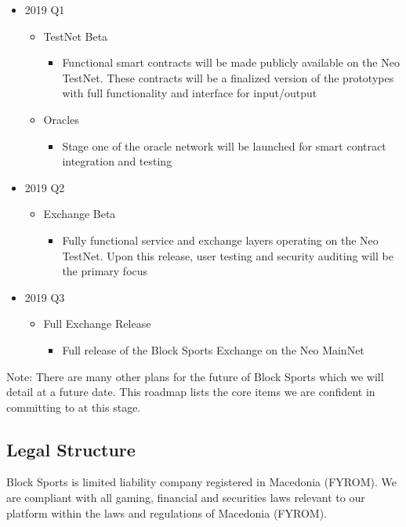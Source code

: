 \documentclass{article}
\begin{document}
\begin{itemize}
   \item 2019 Q1
   \begin{itemize}
     \item TestNet Beta
     	\begin{itemize}
     		\item Functional smart contracts will be made publicly available on the Neo TestNet. These contracts will be a finalized version of the prototypes with full functionality and interface for input/output
     	\end{itemize}
     \item Oracles
     	\begin{itemize}
     		\item Stage one of the oracle network will be launched for smart contract integration and testing
     	\end{itemize}
   \end{itemize}    
 
    \item 2019 Q2
   \begin{itemize}
     \item Exchange Beta
     	\begin{itemize}
     		\item Fully functional service and exchange layers operating on the Neo TestNet. Upon this release, user testing and security auditing will be the primary focus 
     	\end{itemize}
   \end{itemize} 
   
   \item 2019 Q3
   \begin{itemize}
     \item Full Exchange Release
     	\begin{itemize}
     		\item Full release of the Block Sports Exchange on the Neo MainNet
     	\end{itemize}
   \end{itemize} 
   
\end{itemize}

Note: There are many other plans for the future of Block Sports which we will detail at a future date. This roadmap lists the core items we are confident in committing to at this stage. 

	\subsection{Legal Structure}
Block Sports is limited liability company registered in Macedonia (FYROM). We are compliant with all gaming, financial and securities laws relevant to our platform within the laws and regulations of Macedonia (FYROM).
	
\end{document}
